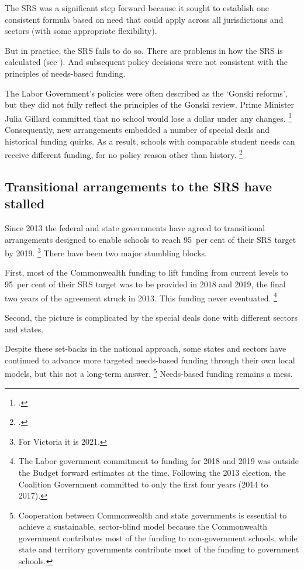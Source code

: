 \documentclass{grattan}
\begin{document}
The SRS was a significant step forward because it sought to establish one consistent formula based on need that could apply across all jurisdictions and sectors (with some appropriate flexibility).

But in practice, the SRS fails to do so. There are problems in how the SRS is calculated (see ).
And subsequent policy decisions were not consistent with the principles of needs-based funding.

The Labor Government's policies were often described as the `Gonski reforms', but they did not fully reflect the principles of the Gonski review. Prime Minister Julia Gillard committed that no school would lose a dollar under any changes.%
\footcite[][xxi]{Gonski2011ReviewFundingSchooling}
Consequently, new arrangements embedded a number of special deals and historical funding quirks. As a result, schools with comparable student needs can receive different funding, for no policy reason other than history.%
\footcite{Gallash2013SecretGonskiDeals}

\subsection{Transitional arrangements to the SRS have stalled }\label{subsec:transitional-arrangements-to-the-srs-have-stalled}

Since 2013 the federal and state governments have agreed to transitional arrangements designed to enable schools to reach 95~per cent of their SRS target by 2019.%
\footnote{For Victoria it is 2021.} %
There have been two major stumbling blocks.

First, most of the Commonwealth funding to lift funding from current levels to 95~per cent of their SRS target was to be provided in 2018 and 2019, the final two years of the agreement struck in 2013.
This funding never eventuated.%
\footnote{The Labor government commitment to funding for 2018 and 2019 was outside the Budget forward estimates at the time.
Following the 2013 election, the Coalition Government committed to only the first four years (2014 to 2017).}

Second, the picture is complicated by the special deals done with different sectors and states.

Despite these set-backs in the national approach, some states and sectors have continued to advance more targeted needs-based funding through their own local models, but this not a long-term answer.%
\footnote{Cooperation between Commonwealth and state governments is essential to achieve a sustainable, sector-blind model because the Commonwealth government contributes most of the funding to non-government schools, while state and territory governments contribute most of the funding to government schools.}
Needs-based funding remains a mess.
\end{document}
